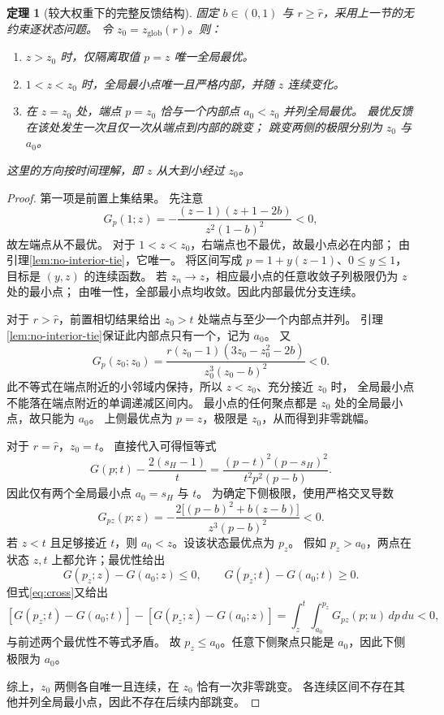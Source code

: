 \documentclass[UTF8,zihao=-4]{ctexart}
\newtheorem{theorem}{定理}
\theoremstyle{definition}
\newcommand{\rhat}{\hat r}
\newcommand{\zglob}{z_{\mathrm{glob}}}
\begin{document}
\begin{theorem}[较大权重下的完整反馈结构]\label{thm:BC}
固定 $b\in(0,1)$ 与 $r\ge\rhat$，采用上一节的无约束逐状态问题。
令 $z_0=\zglob(r)$。则：
\begin{enumerate}
\item $z>z_0$ 时，仅隔离取值 $p=z$ 唯一全局最优。
\item $1<z<z_0$ 时，全局最小点唯一且严格内部，并随 $z$ 连续变化。
\item 在 $z=z_0$ 处，端点 $p=z_0$ 恰与一个内部点 $a_0<z_0$ 并列全局最优。
最优反馈在该处发生一次且仅一次从端点到内部的跳变；
跳变两侧的极限分别为 $z_0$ 与 $a_0$。
\end{enumerate}
这里的方向按时间理解，即 $z$ 从大到小经过 $z_0$。
\end{theorem}
\begin{proof}
第一项是前置上集结果。
先注意
\[
 G_p(1;z)=-\frac{(z-1)(z+1-2b)}{z^2(1-b)^2}<0,
\]
故左端点从不最优。
对于 $1<z<z_0$，右端点也不最优，故最小点必在内部；
由引理\ref{lem:no-interior-tie}，它唯一。
将区间写成 $p=1+y(z-1)$、$0\le y\le1$，目标是 $(y,z)$ 的连续函数。
若 $z_n\to z$，相应最小点的任意收敛子列极限仍为 $z$ 处的最小点；
由唯一性，全部最小点均收敛。因此内部最优分支连续。

对于 $r>\rhat$，前置相切结果给出 $z_0>t$ 处端点与至少一个内部点并列。
引理\ref{lem:no-interior-tie}保证此内部点只有一个，记为 $a_0$。
又
\[
 G_p(z_0;z_0)
 =\frac{r(z_0-1)(3z_0-z_0^2-2b)}{z_0^3(z_0-b)^2}<0.
\]
此不等式在端点附近的小邻域内保持，所以 $z<z_0$、充分接近 $z_0$ 时，
全局最小点不能落在端点附近的单调递减区间内。
最小点的任何聚点都是 $z_0$ 处的全局最小点，故只能为 $a_0$。
上侧最优点为 $p=z$，极限是 $z_0$，从而得到非零跳幅。

对于 $r=\rhat$，$z_0=t$。
直接代入可得恒等式
\begin{equation}\label{eq:hat-square}
 G(p;t)-\frac{2(s_H-1)}t
 =\frac{(p-t)^2(p-s_H)^2}{t^2p^2(p-b)}.
\end{equation}
因此仅有两个全局最小点 $a_0=s_H$ 与 $t$。
为确定下侧极限，使用严格交叉导数
\begin{equation}\label{eq:cross}
 G_{pz}(p;z)
 =-\frac{2\bigl[(p-b)^2+b(z-b)\bigr]}{z^3(p-b)^2}<0.
\end{equation}
若 $z<t$ 且足够接近 $t$，则 $a_0<z$。设该状态最优点为 $p_z$。
假如 $p_z>a_0$，两点在状态 $z,t$ 上都允许；最优性给出
\[
 G(p_z;z)-G(a_0;z)\le0,\qquad
 G(p_z;t)-G(a_0;t)\ge0.
\]
但式\eqref{eq:cross}又给出
\[
 [G(p_z;t)-G(a_0;t)]-[G(p_z;z)-G(a_0;z)]
 =\int_z^t\!\int_{a_0}^{p_z}G_{pz}(p;u)\,dp\,du<0,
\]
与前述两个最优性不等式矛盾。
故 $p_z\le a_0$。任意下侧聚点只能是 $a_0$，因此下侧极限为 $a_0$。

综上，$z_0$ 两侧各自唯一且连续，在 $z_0$ 恰有一次非零跳变。
各连续区间不存在其他并列全局最小点，因此不存在后续内部跳变。
\end{proof}
\end{document}
